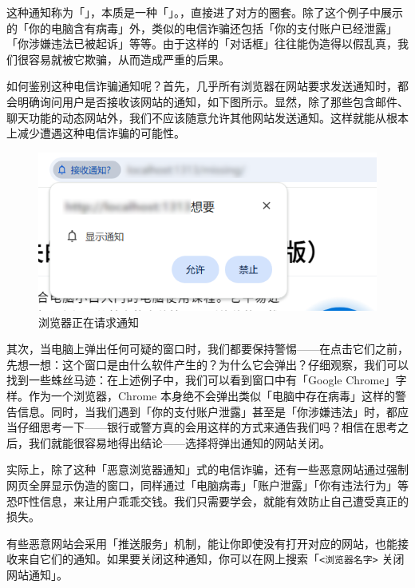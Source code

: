 这种通知称为「」，本质是一种「」。，直接进了对方的圈套。除了这个例子中展示的「你的电脑含有病毒」外，类似的电信诈骗还包括「你的支付账户已经泄露」「你涉嫌违法已被起诉」等等。由于这样的「对话框」往往能伪造得以假乱真，我们很容易就被它欺骗，从而造成严重的后果。

如何鉴别这种电信诈骗通知呢？首先，几乎所有浏览器在网站要求发送通知时，都会明确询问用户是否接收该网站的通知，如下图所示。显然，除了那些包含邮件、聊天功能的动态网站外，我们不应该随意允许其他网站发送通知。这样就能从根本上减少遭遇这种电信诈骗的可能性。

\begin{figure}[htb!]
  \centering
  \includegraphics[width=.6\textwidth]{assets/basic/Website_ask_for_notification_permission.png}
  \caption{浏览器正在请求通知}
  \label{fig:Website_ask_for_notification_permission}
\end{figure}

其次，当电脑上弹出任何可疑的窗口时，我们都要保持警惕——在点击它们之前，先想一想：这个窗口是由什么软件产生的？为什么它会弹出？仔细观察，我们可以找到一些蛛丝马迹：在上述例子中，我们可以看到窗口中有「Google Chrome」字样。作为一个浏览器，Chrome 本身绝不会弹出类似「电脑中存在病毒」这样的警告信息。同时，当我们遇到「你的支付账户泄露」甚至是「你涉嫌违法」时，都应当仔细思考一下——银行或警方真的会用这样的方式来通告我们吗？相信在思考之后，我们就能很容易地得出结论——选择将弹出通知的网站关闭。

实际上，除了这种「恶意浏览器通知」式的电信诈骗，还有一些恶意网站通过强制网页全屏显示伪造的窗口，同样通过「电脑病毒」「账户泄露」「你有违法行为」等恐吓性信息，来让用户乖乖交钱。我们只需要学会，就能有效防止自己遭受真正的损失。

\begin{note}
  有些恶意网站会采用「推送服务」机制，能让你即使没有打开对应的网站，也能接收来自它们的通知。如果要关闭这种通知，你可以在网上搜索「\texttt{<浏览器名字>} 关闭网站通知」。
\end{note}

